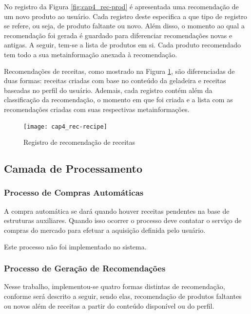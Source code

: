 No registro da Figura \ref{fig:cap4_rec-prod} é apresentada uma recomendação de um novo produto ao usuário. Cada registro deste especifica a que tipo de registro se refere, ou seja, de produto faltante ou novo. Além disso, o momento ao qual a recomendação foi gerada é guardado para diferenciar recomendações novas e antigas. A seguir, tem-se a lista de produtos em si. Cada produto recomendado tem todo a sua metainformação anexada à recomendação.


Recomendações de receitas, como mostrado na Figura \ref{fig:cap4_rec-recipe}, são diferenciadas de duas formas: receitas criadas com base no conteúdo da geladeira e receitas baseadas no perfil do usuário. Ademais, cada registro contém além da classificação da recomendação, o momento em que foi criada e a lista com as recomendações criadas com suas respectivas metainformações.

\begin{figure}[H]
    \caption{Registro de recomendação de receitas}
    \label{fig:cap4_rec-recipe}
    \texttt{[image: cap4\_rec-recipe]}
\end{figure}


\subsection{Camada de Processamento}


\subsubsection{Processo de Compras Automáticas}

A compra automática se dará quando houver receitas pendentes na base de estruturas auxiliares. Quando isso ocorrer o processo deve contatar o serviço de compras do mercado para efetuar a aquisição definida pelo usuário.

Este processo não foi implementado no sistema.

\subsubsection{Processo de Geração de Recomendações}

Nesse trabalho, implementou-se quatro formas distintas de recomendação, conforme será descrito a seguir, sendo elas, recomendação de produtos faltantes ou novos além de receitas a partir do conteúdo disponível ou do perfil.

